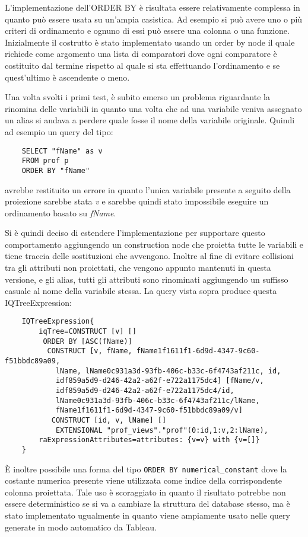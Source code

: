 L'implementazione dell'ORDER BY è risultata essere relativamente complessa in quanto può essere usata su un'ampia casistica. Ad esempio si può avere uno o più criteri di ordinamento e
ognuno di essi può essere una colonna o una funzione. Inizialmente il costrutto è stato implementato usando un order by node il quale richiede come argomento una lista di comparatori
dove ogni comparatore è costituito dal termine rispetto al quale si sta effettuando l'ordinamento e se quest'ultimo è ascendente o meno.

Una volta svolti i primi test, è subito emerso un problema riguardante la rinomina delle variabili in quanto una volta che ad una variabile veniva assegnato un alias si andava a perdere
quale fosse il nome della variabile originale. Quindi ad esempio un query del tipo:
\begin{verbatim}
    SELECT "fName" as v
    FROM prof p 
    ORDER BY "fName"
\end{verbatim}
avrebbe restituito un errore in quanto l'unica variabile presente a seguito della proiezione sarebbe stata \textit{v} e sarebbe quindi stato impossibile eseguire un ordinamento basato su
\textit{fName}.

Si è quindi deciso di estendere l'implementazione per supportare questo comportamento aggiungendo un construction node che proietta tutte le variabili e tiene traccia delle sostituzioni che
avvengono. Inoltre al fine di evitare collisioni tra gli attributi non proiettati, che vengono appunto mantenuti in questa versione, e gli alias, tutti gli attributi sono rinominati aggiungendo un
suffisso casuale al nome della variabile stessa. La query vista sopra produce questa IQTreeExpression:
\begin{verbatim}
    IQTreeExpression{
        iqTree=CONSTRUCT [v] []
         ORDER BY [ASC(fName)]
          CONSTRUCT [v, fName, fName1f1611f1-6d9d-4347-9c60-f51bbdc89a09, 
            lName, lName0c931a3d-93fb-406c-b33c-6f4743af211c, id, 
            idf859a5d9-d246-42a2-a62f-e722a1175dc4] [fName/v, 
            idf859a5d9-d246-42a2-a62f-e722a1175dc4/id, 
            lName0c931a3d-93fb-406c-b33c-6f4743af211c/lName, 
            fName1f1611f1-6d9d-4347-9c60-f51bbdc89a09/v]
           CONSTRUCT [id, v, lName] []
            EXTENSIONAL "prof_views"."prof"(0:id,1:v,2:lName), 
        raExpressionAttributes=attributes: {v=v} with {v=[]}
    } 
\end{verbatim}

\`E inoltre possibile una forma del tipo \verb+ORDER BY numerical_constant+ dove la costante numerica presente viene utilizzata come indice della corrispondente colonna proiettata. Tale
uso è scoraggiato in quanto il risultato potrebbe non essere deterministico se si va a cambiare la struttura del database stesso, ma è stato implementato ugualmente in quanto viene
ampiamente usato nelle query generate in modo automatico da Tableau.

